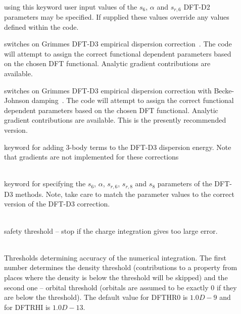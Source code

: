 \begin{description}
\item[]
   \\
  using this keyword user input values of the $s_6$, $\alpha$ and $s_{r,6}$ DFT-D2 parameters may be specified. If supplied these values override
  any values defined within the code.

\item[]
  switches on Grimmes DFT-D3 empirical dispersion correction~\cite{dft:dftd3}. The code will attempt to assign the correct functional dependent 
  parameters based on the chosen DFT functional. Analytic gradient contributions are available.
  
\item[]
  switches on Grimmes DFT-D3 empirical dispersion correction with Becke-Johnson damping~\cite{dft:dftd3bj}. 
  The code will attempt to assign the correct functional dependent parameters based on the chosen DFT functional. 
  Analytic gradient contributions are available. This is the presently recommended version.
  
\item[]
  keyword for adding 3-body terms to the DFT-D3 dispersion energy. Note that gradients are not implemented for these corrections 

\item[]
   \\
  keyword for specifying the $s_6$, $\alpha$, $s_{r,6}$, $s_{r,8}$ and $s_8$ parameters of the DFT-D3 methods. Note, take care to 
  match the parameter values to the correct version of the DFT-D3 correction.

\item[]
   \\
  safety threshold -- stop if the charge integration gives too large
  error.

\item[]
   \\
  Thresholds determining accuracy of the numerical integration. The
  first number determines the density threshold (contributions to a
  property from places where the density is below the threshold will
  be skipped) and the second one -- orbital threshold (orbitals are
  assumed to be exactly 0 if they are below the threshold). The
  default value for DFTHR0 is $1.0D-9$ and for DFTRHI is $1.0D-13$.


\end{description}
